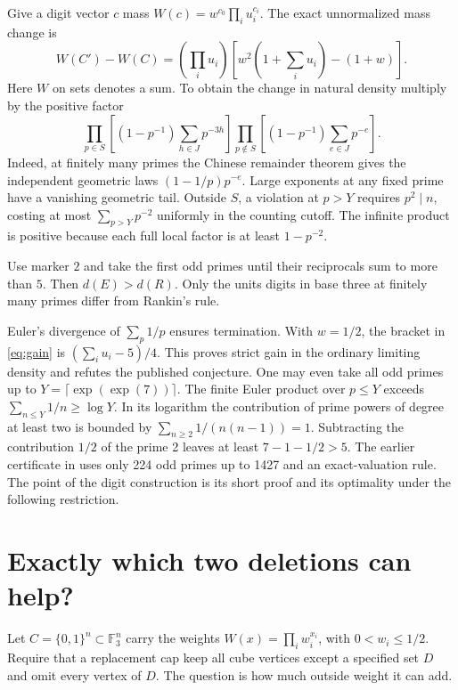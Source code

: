 Give a digit vector $c$ mass $W(c)=w^{c_0}\prod_i u_i^{c_i}$. The exact unnormalized mass change is
\begin{equation}\label{eq:gain}
 W(C')-W(C)=\left(\prod_i u_i\right)
 \left[w^2\left(1+\sum_i u_i\right)-(1+w)\right].
\end{equation}
Here $W$ on sets denotes a sum. To obtain the change in natural density multiply by the positive factor
\[
 \prod_{p\in S}\left[(1-p^{-1})\sum_{h\in J}p^{-3h}\right]
 \prod_{p\notin S}\left[(1-p^{-1})\sum_{e\in J}p^{-e}\right].
\]
Indeed, at finitely many primes the Chinese remainder theorem gives the independent geometric laws $(1-1/p)p^{-e}$. Large exponents at any fixed prime have a vanishing geometric tail. Outside $S$, a violation at $p>Y$ requires $p^2\mid n$, costing at most $\sum_{p>Y}p^{-2}$ uniformly in the counting cutoff. The infinite product is positive because each full local factor is at least $1-p^{-2}$.

\begin{theorem}\label{th:rankin}
Use marker $2$ and take the first odd primes until their reciprocals sum to more than $5$. Then $d(E)>d(R)$. Only the units digits in base three at finitely many primes differ from Rankin's rule.
\end{theorem}
Euler's divergence of $\sum_p1/p$ ensures termination. With $w=1/2$, the bracket in \eqref{eq:gain} is $(\sum_i u_i-5)/4$. This proves strict gain in the ordinary limiting density and refutes the published conjecture. One may even take all odd primes up to $Y=\lceil\exp(\exp(7))\rceil$. The finite Euler product over $p\le Y$ exceeds $\sum_{n\le Y}1/n\ge\log Y$. In its logarithm the contribution of prime powers of degree at least two is bounded by $\sum_{n\ge2}1/(n(n-1))=1$. Subtracting the contribution $1/2$ of the prime 2 leaves at least $7-1-1/2>5$. The earlier certificate in \cite{incomingmc} uses only 224 odd primes up to 1427 and an exact-valuation rule. The point of the digit construction is its short proof and its optimality under the following restriction.

\section{Exactly which two deletions can help?}\label{sec:classification}
Let $C=\{0,1\}^n\subset\mathbb F_3^n$ carry the weights $W(x)=\prod_i w_i^{x_i}$, with $0<w_i\le1/2$. Require that a replacement cap keep all cube vertices except a specified set $D$ and omit every vertex of $D$. The question is how much outside weight it can add.

